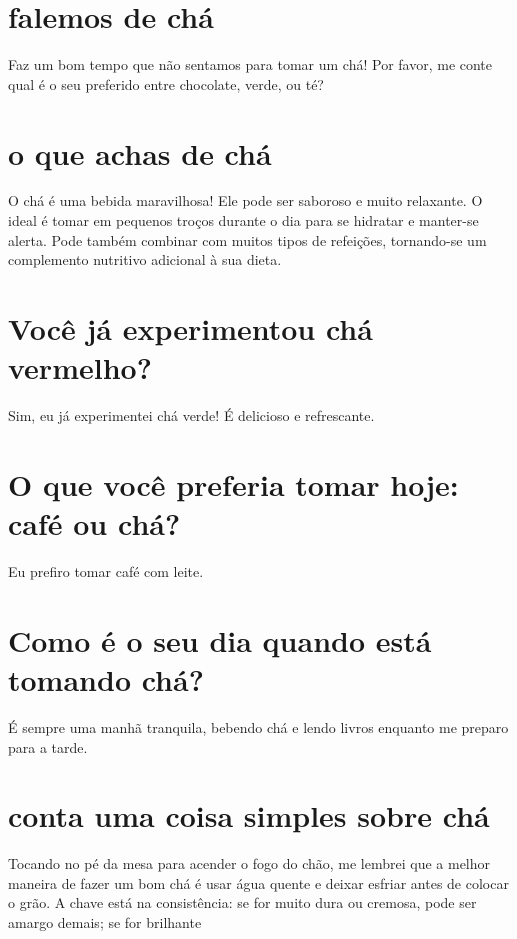 \documentclass[11pt,a4paper]{article}
\begin{document}
\maketitle
\begin{abstract}Exploração do ollama a partir de sementes banais (nível 1). Teoria continua de fora.\end{abstract}
\section{falemos de chá}
Faz um bom tempo que não sentamos para tomar um chá! Por favor, me conte qual é o seu preferido entre chocolate, verde, ou té?

\section{o que achas de chá}
O chá é uma bebida maravilhosa! Ele pode ser saboroso e muito relaxante. O ideal é tomar em pequenos troços durante o dia para se hidratar e manter-se alerta. Pode também combinar com muitos tipos de refeições, tornando-se um complemento nutritivo adicional à sua dieta.

\section{Você já experimentou chá vermelho?}
Sim, eu já experimentei chá verde! É delicioso e refrescante.

\section{O que você preferia tomar hoje: café ou chá?}
Eu prefiro tomar café com leite.

\section{Como é o seu dia quando está tomando chá?}
É sempre uma manhã tranquila, bebendo chá e lendo livros enquanto me preparo para a tarde.

\section{conta uma coisa simples sobre chá}
Tocando no pé da mesa para acender o fogo do chão, me lembrei que a melhor maneira de fazer um bom chá é usar água quente e deixar esfriar antes de colocar o grão. A chave está na consistência: se for muito dura ou cremosa, pode ser amargo demais; se for brilhante
\end{document}
